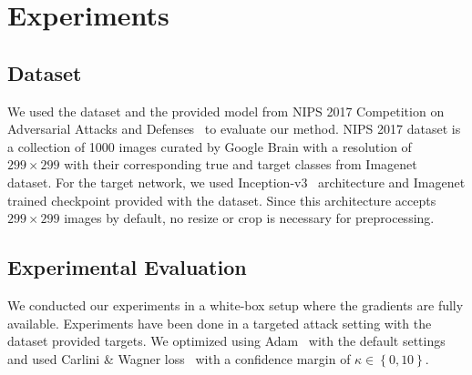 \chapter{Experiments}
\label{chp:4_results}
\section{Dataset}

We used the dataset and the provided model from NIPS 2017 Competition on Adversarial Attacks and Defenses~\cite{kurakin2018adversarial} to evaluate our method. NIPS 2017 dataset is a collection of 1000 images curated by Google Brain with a resolution of \(299 \times 299\) with their corresponding true and target classes from Imagenet~\cite{deng2009imagenet} dataset. For the target network, we used Inception-v3~\cite{szegedy2016rethinking} architecture and Imagenet trained checkpoint provided with the dataset. Since this architecture accepts \(299 \times 299\) images by default, no resize or crop is necessary for preprocessing.
\section{Experimental Evaluation}
We conducted our experiments in a white-box setup where the gradients are fully available. Experiments have been done in a targeted attack setting with the dataset provided targets. We optimized using Adam~\cite{kingma2015adam} with the default settings and used Carlini \& Wagner loss~\cite{carlini2017towards} with a confidence margin of \(\kappa \in \left\{ 0, 10 \right\}\).


